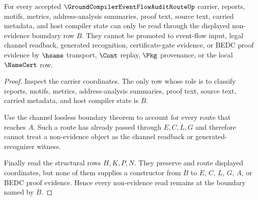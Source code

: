 \begin{theorem}
\label{thm:groundcompiler-event-flow-audit-route-non-evidence-boundary}
For every accepted $\GroundCompilerEventFlowAuditRouteUp$ carrier, reports, motifs, metrics, address-analysis summaries, proof text, source text, carried metadata, and host compiler state can only be read through the displayed non-evidence boundary row $B$. They cannot be promoted to event-flow input, legal channel readback, generated recognition, certificate-gate evidence, or BEDC proof evidence by $\hsame$ transport, $\Cont$ replay, $\Pkg$ provenance, or the local $\NameCert$ row.
\end{theorem}
\begin{proof}
Inspect the carrier coordinates. The only row whose role is to classify reports, motifs, metrics, address-analysis summaries, proof text, source text, carried metadata, and host compiler state is $B$.

Use the channel lossless boundary theorem to account for every route that reaches $A$. Such a route has already passed through $E,C,L,G$ and therefore cannot treat a non-evidence object as the channel readback or generated-recognizer witness.

Finally read the structural rows $H,K,P,N$. They preserve and route displayed coordinates, but none of them supplies a constructor from $B$ to $E$, $C$, $L$, $G$, $A$, or BEDC proof evidence. Hence every non-evidence read remains at the boundary named by $B$.
\end{proof}

